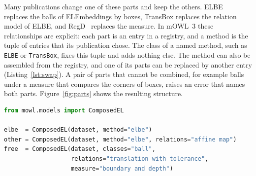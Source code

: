 \documentclass[runningheads]{llncs}
\begin{document}
Many publications change one of these parts and keep the others. ELBE~\cite{peng2020}
replaces the balls of ELEmbeddings by boxes, TransBox replaces the relation model of
ELBE, and RegD~\cite{yang2025regd} replaces the measure. In mOWL~3 these relationships
are explicit: each part is an entry in a registry, and a method is the tuple of entries
that its publication chose. The class of a named method, such as \texttt{ELBE} or
\texttt{TransBox}, fixes this tuple and adds nothing else. The method can also be
assembled from the registry, and one of its parts can be replaced by another entry
(Listing~\ref{lst:swap}). A pair of parts that cannot be combined, for example balls
under a measure that compares the corners of boxes, raises an error that names both
parts. Figure~\ref{fig:parts} shows the resulting structure.

\begin{lstlisting}[language=Python,caption={A published method assembled from its parts,
the same method with another relation model, and a combination that no publication
describes.},label=lst:swap,float=t]
from mowl.models import ComposedEL

elbe  = ComposedEL(dataset, method="elbe")
other = ComposedEL(dataset, method="elbe", relations="affine map")
free  = ComposedEL(dataset, classes="ball",
                   relations="translation with tolerance",
                   measure="boundary and depth")
\end{lstlisting}
\end{document}
